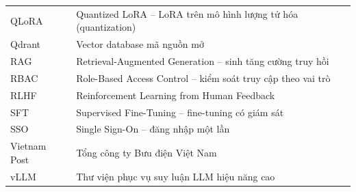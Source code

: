 \begin{longtable}{@{}p{3.2cm}p{11.5cm}@{}}
QLoRA & Quantized LoRA -- LoRA trên mô hình lượng tử hóa (quantization) \\
Qdrant & Vector database mã nguồn mở \\
RAG & Retrieval-Augmented Generation -- sinh tăng cường truy hồi \\
RBAC & Role-Based Access Control -- kiểm soát truy cập theo vai trò \\
RLHF & Reinforcement Learning from Human Feedback \\
SFT & Supervised Fine-Tuning -- fine-tuning có giám sát \\
SSO & Single Sign-On -- đăng nhập một lần \\
Vietnam Post & Tổng công ty Bưu điện Việt Nam \\
vLLM & Thư viện phục vụ suy luận LLM hiệu năng cao \\
\end{longtable}
